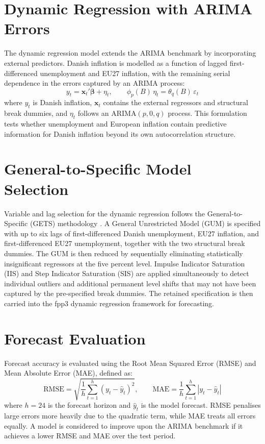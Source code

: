 \section{Dynamic Regression with ARIMA Errors}

The dynamic regression model extends the ARIMA benchmark by incorporating 
external predictors. Danish inflation is modelled as a function of lagged 
first-differenced unemployment and EU27 inflation, with the remaining serial 
dependence in the errors captured by an ARIMA process:
\[
y_t = \mathbf{x}_t'\boldsymbol{\beta} + \eta_t, \qquad 
\phi_p(B)\,\eta_t = \theta_q(B)\,\varepsilon_t
\]
where $y_t$ is Danish inflation, $\mathbf{x}_t$ contains the external regressors 
and structural break dummies, and $\eta_t$ follows an ARIMA$(p,0,q)$ process. 
This formulation tests whether unemployment and European inflation contain 
predictive information for Danish inflation beyond its own autocorrelation 
structure.

\section{General-to-Specific Model Selection}

Variable and lag selection for the dynamic regression follows the 
General-to-Specific (GETS) methodology \parencite{doornik2014}. A General 
Unrestricted Model (GUM) is specified with up to six lags of first-differenced 
Danish unemployment, EU27 inflation, and first-differenced EU27 unemployment, 
together with the two structural break dummies. The GUM is then reduced by 
sequentially eliminating statistically insignificant regressors at the five 
percent level. Impulse Indicator Saturation (IIS) and Step Indicator Saturation 
(SIS) are applied simultaneously to detect individual outliers and additional 
permanent level shifts that may not have been captured by the pre-specified break 
dummies. The retained specification is then carried into the fpp3 dynamic 
regression framework for forecasting.

\section{Forecast Evaluation}

Forecast accuracy is evaluated using the Root Mean Squared Error (RMSE) and 
Mean Absolute Error (MAE), defined as:
\[
\text{RMSE} = \sqrt{\frac{1}{h}\sum_{t=1}^{h}(y_t - \hat{y}_t)^2}, \qquad
\text{MAE}  = \frac{1}{h}\sum_{t=1}^{h}|y_t - \hat{y}_t|
\]
where $h = 24$ is the forecast horizon and $\hat{y}_t$ is the model forecast. 
RMSE penalises large errors more heavily due to the quadratic term, while MAE 
treats all errors equally. A model is considered to improve upon the ARIMA 
benchmark if it achieves a lower RMSE and MAE over the test period.